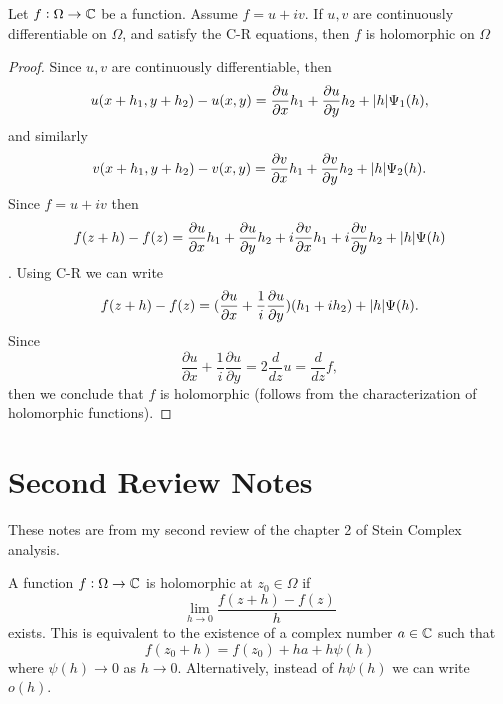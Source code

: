 \begin{theorem}
	Let $ f: \Omega \to \mathbb{C} $ be a function. Assume $ f = u + iv $. If $ u,v $ are continuously differentiable on $ \Omega $, and satisfy the C-R equations, then $ f $ is holomorphic on $ \Omega $
\end{theorem}
\begin{proof}
	Since $ u,v $ are continuously differentiable, then
	\[ u(x+h_1,y+h_2) - u(x,y) = \frac{\partial u}{\partial x} h_1 + \frac{\partial u}{\partial y} h_2 + |h|\Psi_1(h), \]
	and similarly
	\[ v(x+h_1, y+h_2) - v(x,y) = \frac{\partial v}{\partial x} h_1 + \frac{\partial v}{\partial y} h_2 + |h|\Psi_2(h). \]
	Since $ f = u + iv $ then
	\[ f(z+h) - f(z) = \frac{\partial u}{\partial x} h_1 + \frac{\partial u}{\partial y}h_2 + i \frac{\partial v}{\partial x}h_1 + i\frac{\partial v}{\partial y}h_2 + |h|\Psi(h)\].
	Using C-R we can write
	\[ f(z+h) - f(z) = (\frac{\partial u}{\partial x} + \frac{1}{i}\frac{\partial u}{\partial y})(h_1+ih_2) + |h|\Psi(h). \]
	Since 
	\[ \frac{\partial u}{\partial x} + \frac{1}{i}\frac{\partial u}{\partial y} = 2 \frac{d}{dz} u = \frac{d}{dz}f, \]
	then we conclude that $ f $ is holomorphic (follows from the characterization of holomorphic functions).
\end{proof}

\section{Second Review Notes}
These notes are from my second review of the chapter 2 of Stein Complex analysis.

A function $ f: \Omega \to \mathbb{C} $ is holomorphic at $ z_0 \in \Omega $ if 
\[ \lim_{h\to 0} \frac{f(z+h) - f(z) }{h}  \]
exists. This is equivalent to the existence of a complex number $ a \in \mathbb{C} $ such that 
\[ f(z_0 + h) = f(z_0) + h a + h \psi(h) \]
where $ \psi(h) \to 0 $ as $ h \to 0 $. Alternatively, instead of $ h\psi(h) $ we can write $ o(h) $.


